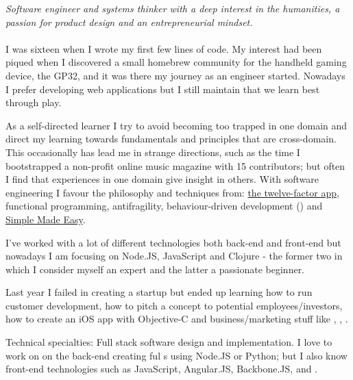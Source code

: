 \documentclass[10pt,a4paper]{article}
\begin{document}
\vspace{-1.3em}  %
\begin{multicols}{2}  %
\noindent \emph{Software engineer and systems thinker with a deep interest in the humanities, a passion for product design and an entrepreneurial mindset.}
\\
\\
I was sixteen when I wrote my first few lines of code. My interest had been piqued when I discovered a small homebrew community for the handheld gaming device, the GP32, and it was there my journey as an engineer started. Nowadays I prefer developing web applications but I still maintain that we learn best through play.\newline

As a self-directed learner I try to avoid becoming too trapped in one domain and direct my learning towards fundamentals and principles that are cross-domain. This occasionally has lead me in strange directions, such as the time I bootstrapped a non-profit online music magazine with 15 contributors; but often I find that experiences in one domain give insight in others. With software engineering I favour the philosophy and techniques from: \href{http://12factor.net}{the twelve-factor app}, functional programming, antifragility, behaviour-driven development () and \href{http://infoq.com/presentations/Simple-Made-Easy}{Simple Made Easy}.\newline

I've worked with a lot of different technologies both back-end and front-end but nowadays I am focusing on Node.JS, JavaScript and Clojure - the former two in which I consider myself an expert and the latter a passionate beginner.\newline

Last year I failed in creating a startup but ended up learning how to run customer development, how to pitch a concept to potential employees/investors, how to create an iOS app with Objective-C and business/marketing stuff like , , .

\end{multicols}

\inlineheadsection  %
  {Technical specialties:}
  {Full stack software design and implementation. I love to work on on the back-end creating ful s using Node.JS or Python; but I also know front-end technologies such as JavaScript, Angular.JS, Backbone.JS,  and .}
\end{document}
